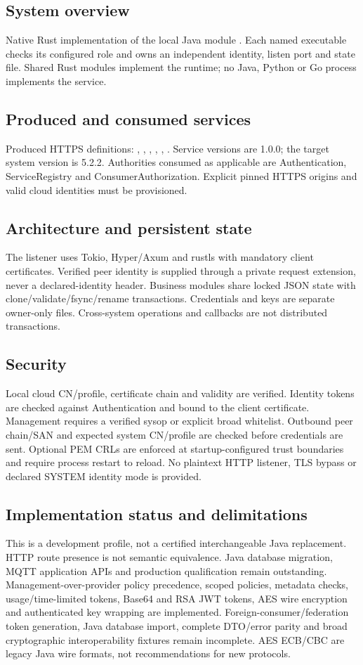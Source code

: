 \documentclass[a4paper]{arrowhead}
\begin{document}
\subsection{System overview}
Native Rust implementation of the local Java module . Each named executable checks its configured role and owns an independent identity, listen port and state file. Shared Rust modules implement the runtime; no Java, Python or Go process implements the service.
\subsection{Produced and consumed services}
Produced HTTPS definitions: , \allowbreak {}, \allowbreak {}, \allowbreak {}, \allowbreak {}, \allowbreak {}. Service versions are 1.0.0; the target system version is 5.2.2. Authorities consumed as applicable are Authentication, ServiceRegistry and ConsumerAuthorization. Explicit pinned HTTPS origins and valid cloud identities must be provisioned.
\subsection{Architecture and persistent state}
The listener uses Tokio, Hyper/Axum and rustls with mandatory client certificates. Verified peer identity is supplied through a private request extension, never a declared-identity header. Business modules share locked JSON state with clone/validate/fsync/rename transactions. Credentials and keys are separate owner-only files. Cross-system operations and callbacks are not distributed transactions.
\subsection{Security}
Local cloud CN/profile, certificate chain and validity are verified. Identity tokens are checked against Authentication and bound to the client certificate. Management requires a verified sysop or explicit broad whitelist. Outbound peer chain/SAN and expected system CN/profile are checked before credentials are sent. Optional PEM CRLs are enforced at startup-configured trust boundaries and require process restart to reload. No plaintext HTTP listener, TLS bypass or declared SYSTEM identity mode is provided.
\subsection{Implementation status and delimitations}
This is a development profile, not a certified interchangeable Java replacement. HTTP route presence is not semantic equivalence. Java database migration, MQTT application APIs and production qualification remain outstanding.
Management-over-provider policy precedence, scoped policies, metadata checks, usage/time-limited tokens, Base64 and RSA JWT tokens, AES wire encryption and authenticated key wrapping are implemented. Foreign-consumer/federation token generation, Java database import, complete DTO/error parity and broad cryptographic interoperability fixtures remain incomplete. AES ECB/CBC are legacy Java wire formats, not recommendations for new protocols.
\clearpage
\end{document}
